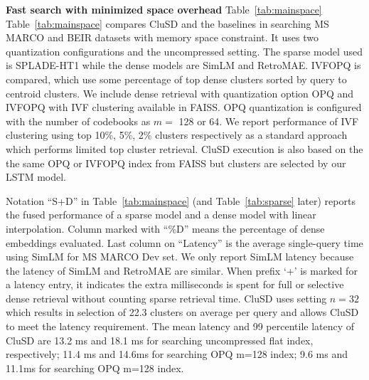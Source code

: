{\bf Fast search with minimized space overhead}
Table~\ref{tab:mainspace} 
Table~\ref{tab:mainspace} compares   CluSD and the baselines in searching MS MARCO and BEIR datasets with memory space constraint. 
It uses two quantization  configurations and the uncompressed setting. 
The sparse model used is SPLADE-HT1 while the dense models are SimLM and RetroMAE.
IVFOPQ is compared, which use some percentage of top dense clusters sorted by query to centroid clusters.
We include dense retrieval with quantization option OPQ and  IVFOPQ with IVF clustering available in FAISS.
OPQ quantization  is configured with  the number of codebooks as $m=$ 128 or 64.  
We report performance of IVF clustering using top 10\%, 5\%, 2\% clusters respectively
as a standard approach which performs   limited top cluster retrieval. 
CluSD execution is also based on the the same OPQ or  IVFOPQ index from  FAISS but clusters are  selected  by our LSTM model. 


Notation ``S+D'' in Table~\ref{tab:mainspace} (and Table~\ref{tab:sparse} later) 
reports the fused performance of a sparse model and a dense model with linear interpolation. 
Column marked with  ``\%D'' means the percentage of dense embeddings  evaluated. 
Last column on ``Latency'' is the average single-query time using SimLM for MS MARCO Dev set.  
We only report SimLM latency because the latency of SimLM and RetroMAE are similar. 
When 	prefix `+' is marked for a latency entry, it indicates  the extra milliseconds is spent 
for full or selective dense retrieval without counting   sparse retrieval time.
CluSD uses setting $n=32$
which results in  selection of 22.3 clusters on average per query 
and allows CluSD to meet  the latency requirement.
The mean latency and 99 percentile latency of CluSD are 13.2 ms and 18.1 ms for searching uncompressed flat index, respectively; 
11.4 ms and 14.6ms for searching OPQ m=128 index;  9.6 ms and 11.1ms for searching OPQ m=128 index.

